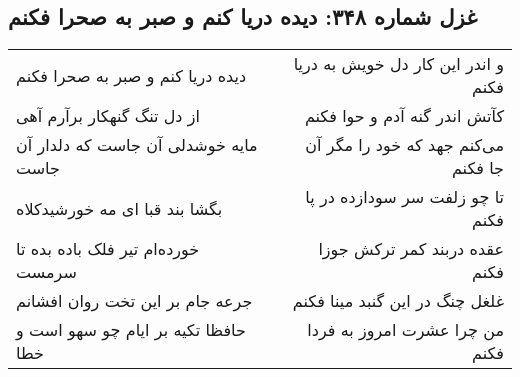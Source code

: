 \begin{center}
\section*{غزل شماره ۳۴۸: دیده دریا کنم و صبر به صحرا فکنم}
\label{sec:sh348}
\begin{longtable}{l p{0.5cm} r}
دیده دریا کنم و صبر به صحرا فکنم
&&
و اندر این کار دل خویش به دریا فکنم
\\
از دل تنگ گنهکار برآرم آهی
&&
کآتش اندر گنه آدم و حوا فکنم
\\
مایه خوشدلی آن جاست که دلدار آن جاست
&&
می‌کنم جهد که خود را مگر آن جا فکنم
\\
بگشا بند قبا ای مه خورشیدکلاه
&&
تا چو زلفت سر سودازده در پا فکنم
\\
خورده‌ام تیر فلک باده بده تا سرمست
&&
عقده دربند کمر ترکش جوزا فکنم
\\
جرعه جام بر این تخت روان افشانم
&&
غلغل چنگ در این گنبد مینا فکنم
\\
حافظا تکیه بر ایام چو سهو است و خطا
&&
من چرا عشرت امروز به فردا فکنم
\\
\end{longtable}
\end{center}
